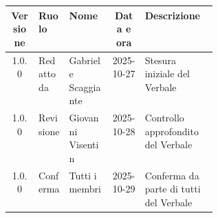 \documentclass[a4paper,12pt]{article}
\begin{document}
\begin{center}
\small
\renewcommand{\arraystretch}{1.2} 
\begin{tabular}{|c|l|l|c|>{\raggedright\arraybackslash}p{0.35\linewidth}|}
\hline
\rowcolor{gray!60} 
\textbf{Versione} & \textbf{Ruolo} & \textbf{Nome} & \textbf{Data e ora} & \textbf{Descrizione} \\
\hline
\rowcolor{white}
1.0.0 & Redatto da & Gabriele Scaggiante & 2025-10-27 & Stesura iniziale del Verbale \\
\hline
\rowcolor{gray!20}
1.0.0 & Revisione & Giovanni Visentin & 2025-10-28 & Controllo approfondito del Verbale \\
\hline
\rowcolor{white}
1.0.0 & Conferma & Tutti i membri & 2025-10-29 & Conferma da parte di tutti del Verbale \\
\hline

\end{tabular}
\end{center}


\end{document}
